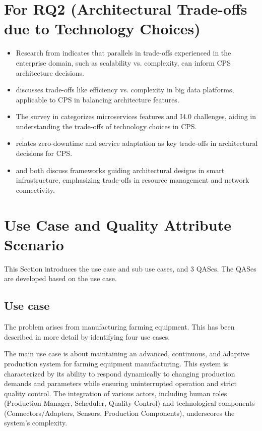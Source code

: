 \documentclass[conference]{IEEEtran}
\begin{document}
\section*{For RQ2 (Architectural Trade-offs due to Technology Choices)}

\begin{itemize}
    \item Research from \cite{AdoptingMicroservicesDevOps} indicates that parallels in trade-offs experienced in the enterprise domain, such as scalability vs. complexity, can inform CPS architecture decisions.
    \item \cite{ABigDataPlatform} discusses trade-offs like efficiency vs. complexity in big data platforms, applicable to CPS in balancing architecture features.
    \item The survey in \cite{UseOfLightweightVirtualization} categorizes microservices features and I4.0 challenges, aiding in understanding the trade-offs of technology choices in CPS.
    \item \cite{DevOpsForCPS} relates zero-downtime and service adaptation as key trade-offs in architectural decisions for CPS.
    \item \cite{IRONEDGE} and \cite{UnifiedArchitecturePowering} both discuss frameworks guiding architectural designs in smart infrastructure, emphasizing trade-offs in resource management and network connectivity.
\end{itemize}



\section{Use Case and Quality Attribute Scenario}
\label{sec:use_case_and_qas}
This Section introduces the use case and sub use cases, and 3 QASes.
The QASes are developed based on the use case.

\subsection{Use case}
\label{sec:use_case}
The problem arises from manufacturing farming equipment. This has been described in more detail by identifying four use cases. 

The main use case is about maintaining an advanced, continuous, and adaptive production system for farming equipment manufacturing. This system is characterized by its ability to respond dynamically to changing production demands and parameters while ensuring uninterrupted operation and strict quality control. The integration of various actors, including human roles (Production Manager, Scheduler, Quality Control) and technological components (Connectors/Adapters, Sensors, Production Components), underscores the system's complexity.
\end{document}
